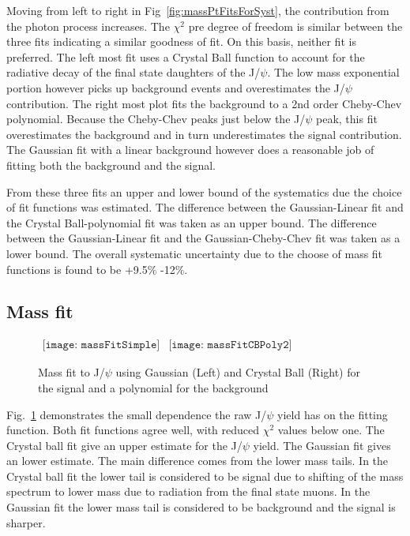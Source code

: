       Moving from left to right in Fig~\ref{fig:massPtFitsForSyst}, the 
        contribution from the photon process increases.
      The $\chi^{2}$ pre degree of freedom is similar between the three 
        fits indicating a similar goodness of fit.
      On this basis, neither fit is preferred. 
      The left most fit uses a Crystal Ball function to account for the 
        radiative decay of the final state daughters of the J/$\psi$.
      The low mass exponential portion however picks up background events 
        and overestimates the J/$\psi$ contribution. 
      The right most plot fits the background to a 2nd order Cheby-Chev 
        polynomial.
      Because the Cheby-Chev peaks just below the J/$\psi$ peak, this fit 
        overestimates the background and in turn underestimates the signal 
        contribution.
      The Gaussian fit with a linear background however does a reasonable job
        of fitting both the background and the signal. 

      From these three fits an upper and lower bound of the systematics due
        the choice of fit functions was estimated. 
      The difference between the Gaussian-Linear fit and the 
        Crystal Ball-polynomial fit was taken as an upper bound. 
      The difference between the Gaussian-Linear fit and the 
          Gaussian-Cheby-Chev fit was taken as a lower bound. 
      The overall systematic uncertainty due to the choose of mass fit 
        functions is found to be +9.5\% -12\%.

    \subsection{Mass fit}

      \begin{figure}[!Hhtb]
        \centering
        $ \begin{array}{cc}
          \texttt{[image: massFitSimple]} &
          \texttt{[image: massFitCBPoly2]}
        \end{array} $
        \caption{Mass fit to J/$\psi$ using Gaussian (Left) and Crystal Ball (Right) for the 
          signal and a polynomial for the background}
        \label{fig:massFitSys}
      \end{figure}
      Fig.~\ref{fig:massFitSys} demonstrates the small dependence the raw 
        J/$\psi$ yield has on the fitting function. 
      Both fit functions agree well, with reduced $\chi^{2}$ values below one.
      The Crystal ball fit give an upper estimate for the J/$\psi$ yield.
      The Gaussian fit gives an lower estimate. 
      The main difference comes from the lower mass tails.
      In the Crystal ball fit the lower tail is considered to be signal due to 
        shifting of the mass spectrum to lower mass due to radiation from the 
        final state muons. 
      In the Gaussian fit the lower mass tail is considered to be background and 
        the signal is sharper.

